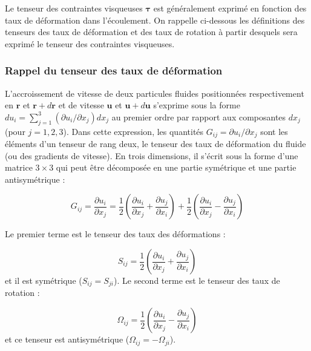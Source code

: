 Le tenseur des contraintes visqueuses $\mathbf{\tau}$ est g\'en\'eralement
exprim\'e en fonction des taux de d\'eformation dans l'\'ecoulement. On
rappelle ci-dessous les d\'efinitions des tenseurs des taux de d\'eformation
et des taux de rotation \`a partir desquels sera exprim\'e le tenseur
des contraintes visqueuses.


\subsubsection*{Rappel du tenseur des taux de d\'eformation}

L'accroissement de vitesse de deux particules fluides positionn\'ees
respectivement en $\mathbf{r}$ et $\mathbf{r}+d\mathbf{r}$ et de
vitesse $\mathbf{u}$ et $\mathbf{u}+d\mathbf{u}$ s'exprime sous
la forme $du_{i}=\sum_{j=1}^{3}(\partial u_{i}/\partial x_{j})dx_{j}$
au premier ordre par rapport aux composantes $dx_{j}$ (pour $j=1,2,3$).
Dans cette expression, les quantit\'es $G_{ij}=\partial u_{i}/\partial x_{j}$
sont les \'el\'ements d'un tenseur de rang deux, le tenseur des taux de
d\'eformation du fluide (ou des gradients de vitesse). En trois dimensions,
il s'\'ecrit sous la forme d'une matrice $3\times3$ qui peut \^etre d\'ecompos\'ee
en une partie sym\'etrique et une partie antisym\'etrique :

\begin{equation}
G_{ij}=\frac{\partial u_{i}}{\partial x_{j}}=\frac{1}{2}\left(\frac{\partial u_{i}}{\partial x_{j}}+\frac{\partial u_{j}}{\partial x_{i}}\right)+\frac{1}{2}\left(\frac{\partial u_{i}}{\partial x_{j}}-\frac{\partial u_{j}}{\partial x_{i}}\right)\label{eq:TauxDeformation}
\end{equation}


Le premier terme est le tenseur des taux des d\'eformations :

\begin{equation}
S_{ij}=\frac{1}{2}\left(\frac{\partial u_{i}}{\partial x_{j}}+\frac{\partial u_{j}}{\partial x_{i}}\right)\label{eq:TenseurDeformations}
\end{equation}
et il est sym\'etrique ($S_{ij}=S_{ji}$). Le second terme est le tenseur
des taux de rotation :

\begin{equation}
\Omega_{ij}=\frac{1}{2}\left(\frac{\partial u_{i}}{\partial x_{j}}-\frac{\partial u_{j}}{\partial x_{i}}\right)\label{eq:TenseurRotations}
\end{equation}
et ce tenseur est antisym\'etrique ($\Omega_{ij}=-\Omega_{ji}$).


